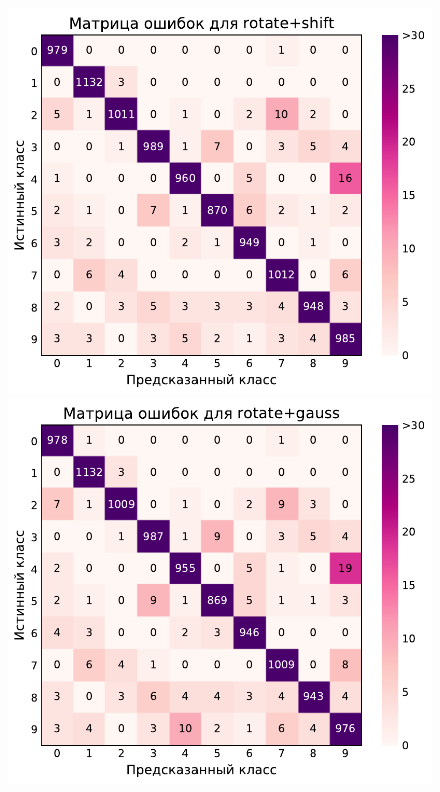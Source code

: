 \documentclass[12pt]{article}
\begin{document}
\begin{figure}[!h]
    \includegraphics[scale=0.6]{5_aug_conf_mat_rotate+shift.pdf}
    \includegraphics[scale=0.6]{5_aug_conf_mat_rotate+gauss.pdf}

\end{figure}
\end{document}

